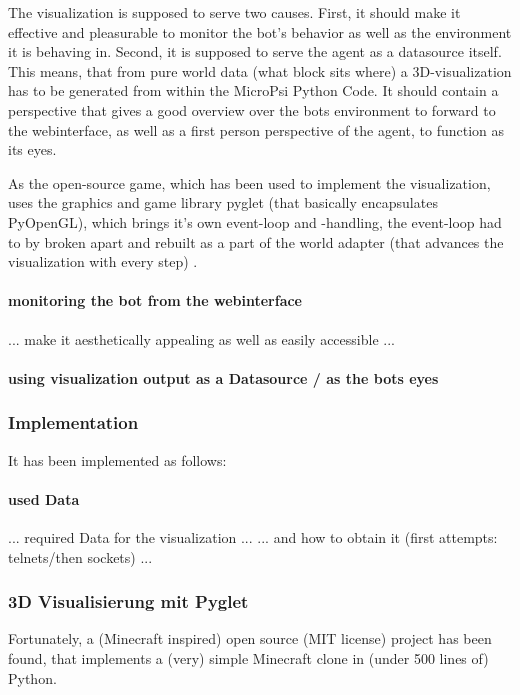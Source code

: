 The visualization is supposed to serve two causes. First, it should make it effective and pleasurable to monitor the bot's behavior as well as the environment it is behaving in. Second, it is supposed to serve the agent as a datasource itself. This means, that from pure world data (what block sits where) a 3D-visualization has to be generated from within the MicroPsi Python Code. It should contain a perspective that gives a good overview over the bots environment to forward to the webinterface, as well as a first person perspective of the agent, to function as its eyes.

As the open-source game, which has been used to implement the visualization, uses the graphics and game library pyglet (that basically encapsulates PyOpenGL), which brings it's own event-loop and -handling, the event-loop had to by broken apart and rebuilt as a part of the world adapter (that advances the visualization with every step) .


\paragraph{monitoring the bot from the webinterface}
... make it aesthetically appealing as well as easily accessible ...

\paragraph{using visualization output as a Datasource / as the bots eyes}

\subsubsection{Implementation}

It has been implemented as follows:

\paragraph{used Data}
... required Data for the visualization ...
... and how to obtain it (first attempts: telnets/then sockets) ...

\subsubsection{3D Visualisierung mit Pyglet}
Fortunately, a (Minecraft inspired) open source (MIT license) project has been found, that implements a (very) simple Minecraft clone in (under 500 lines of) Python.\cite{github_minecraftpython}

